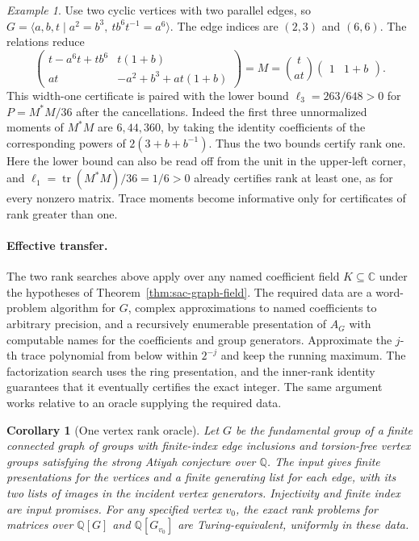 \documentclass[11pt,a4paper,reqno]{amsart}
\numberwithin{equation}{section}
\newtheorem{corollary}[theorem]{Corollary}
\theoremstyle{remark}
\newtheorem*{example}{Example}
\newcommand{\C}{\mathbb C}
\newcommand{\Q}{\mathbb Q}
\begin{document}
\begin{example}
Use two cyclic vertices with two parallel edges, so
\(G=\langle a,b,t\mid a^2=b^3,\ t b^6t^{-1}=a^6\rangle\).
The edge indices are \((2,3)\) and \((6,6)\). The relations reduce
\[
 \begin{pmatrix}
 t-a^6t+tb^6 & t(1+b)\\
 at & -a^2+b^3+at(1+b)
 \end{pmatrix}
 =
 M=\binom{t}{at}\begin{pmatrix}1&1+b\end{pmatrix}.
\]
This width-one certificate is paired with the lower bound \(\ell_3=263/648>0\) for \(P=M^*M/36\) after the cancellations. Indeed the first three unnormalized moments of \(M^*M\) are \(6,44,360\), by taking the identity coefficients of the corresponding powers of \(2(3+b+b^{-1})\). Thus the two bounds certify rank one. Here the lower bound can also be read off from the unit in the upper-left corner, and \(\ell_1=\operatorname{tr}(M^*M)/36=1/6>0\) already certifies rank at least one, as for every nonzero matrix. Trace moments become informative only for certificates of rank greater than one.
\end{example}

\paragraph{Effective transfer.}
The two rank searches above apply over any named coefficient field \(K\subseteq\C\) under the hypotheses of Theorem~\ref{thm:sac-graph-field}. The required data are a word-problem algorithm for \(G\), complex approximations to named coefficients to arbitrary precision, and a recursively enumerable presentation of \(A_G\) with computable names for the coefficients and group generators. Approximate the \(j\)-th trace polynomial from below within \(2^{-j}\) and keep the running maximum. The factorization search uses the ring presentation, and the inner-rank identity guarantees that it eventually certifies the exact integer. The same argument works relative to an oracle supplying the required data.

\begin{corollary}[One vertex rank oracle]\label{cor:oneoracle}
Let \(G\) be the fundamental group of a finite connected graph of groups with finite-index edge inclusions and torsion-free vertex groups satisfying the strong Atiyah conjecture over \(\Q\). The input gives finite presentations for the vertices and a finite generating list for each edge, with its two lists of images in the incident vertex generators. Injectivity and finite index are input promises. For any specified vertex \(v_0\), the exact rank problems for matrices over \(\Q[G]\) and \(\Q[G_{v_0}]\) are Turing-equivalent, uniformly in these data.
\end{corollary}
\end{document}
